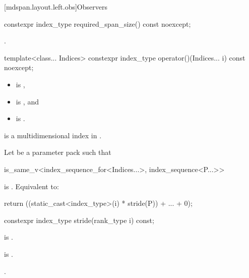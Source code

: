 [mdspan.layout.left.obs]{Observers}

%
\begin{itemdecl}
constexpr index_type required_span_size() const noexcept;
\end{itemdecl}

\begin{itemdescr}
\pnum
\returns
{}.
\end{itemdescr}

%
\begin{itemdecl}
template<class... Indices>
  constexpr index_type operator()(Indices... i) const noexcept;
\end{itemdecl}

\begin{itemdescr}
\pnum
\constraints
\begin{itemize}
\item
{} is ,
\item
{} is , and
\item
{} is .
\end{itemize}

\pnum
\expects
{} is
a multidimensional index in .

\pnum
\effects
Let  be a parameter pack such that
\begin{codeblock}
is_same_v<index_sequence_for<Indices...>, index_sequence<P...>>
\end{codeblock}
is .
Equivalent to:
\begin{codeblock}
return ((static_cast<index_type>(i) * stride(P)) + ... + 0);
\end{codeblock}
\end{itemdescr}

%
\begin{itemdecl}
constexpr index_type stride(rank_type i) const;
\end{itemdecl}

\begin{itemdescr}
\pnum
\constraints
{} is .

\pnum
\expects
{} is .

\pnum
\returns
{}.
\end{itemdescr}

